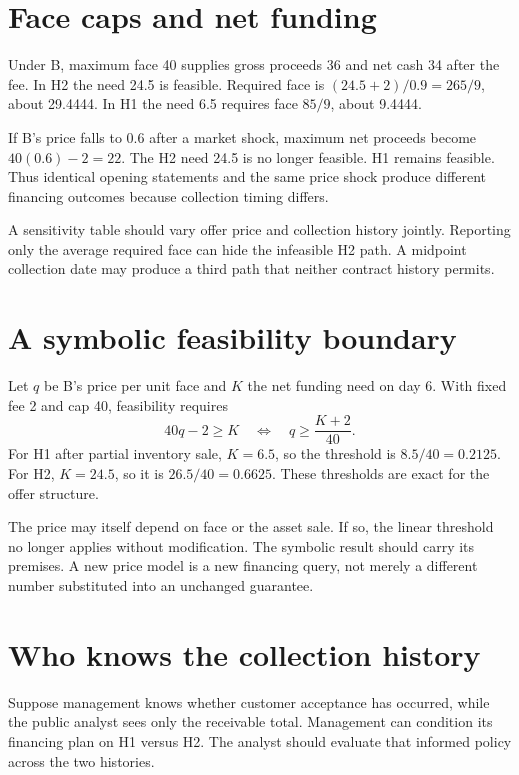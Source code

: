 \section{Face caps and net funding}
Under B, maximum face 40 supplies gross proceeds 36 and net cash 34 after the fee. In H2 the need 24.5 is feasible. Required face is $(24.5+2)/0.9=265/9$, about 29.4444. In H1 the need 6.5 requires face $85/9$, about 9.4444.

If B's price falls to 0.6 after a market shock, maximum net proceeds become $40(0.6)-2=22$. The H2 need 24.5 is no longer feasible. H1 remains feasible. Thus identical opening statements and the same price shock produce different financing outcomes because collection timing differs.

A sensitivity table should vary offer price and collection history jointly. Reporting only the average required face can hide the infeasible H2 path. A midpoint collection date may produce a third path that neither contract history permits.

\section{A symbolic feasibility boundary}
Let $q$ be B's price per unit face and $K$ the net funding need on day 6. With fixed fee 2 and cap 40, feasibility requires
\begin{equation}
 40q-2\geq K\quad\Longleftrightarrow\quad q\geq\frac{K+2}{40}.
\end{equation}
For H1 after partial inventory sale, $K=6.5$, so the threshold is $8.5/40=0.2125$. For H2, $K=24.5$, so it is $26.5/40=0.6625$. These thresholds are exact for the offer structure.

The price may itself depend on face or the asset sale. If so, the linear threshold no longer applies without modification. The symbolic result should carry its premises. A new price model is a new financing query, not merely a different number substituted into an unchanged guarantee.

\section{Who knows the collection history}
Suppose management knows whether customer acceptance has occurred, while the public analyst sees only the receivable total. Management can condition its financing plan on H1 versus H2. The analyst should evaluate that informed policy across the two histories.


